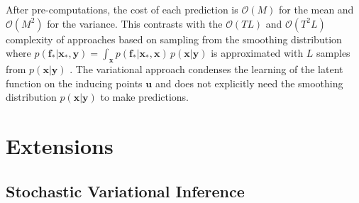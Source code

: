 \documentclass{article} %
\newcommand{\n}[1]{\mathbf{#1}}
\newcommand{\x}{\mathbf{x}}
\newcommand{\y}{\mathbf{y}}
\newcommand{\bSigma}{\boldsymbol\Sigma}
\begin{document}
After pre-computations, the cost of each prediction is $\mathcal{O}(M)$ for the mean and  $\mathcal{O}(M^2)$ for the variance. This contrasts with the $\mathcal{O}(T L)$ and $\mathcal{O}( T^2 L)$ complexity of approaches based on sampling from the smoothing distribution where
$
	p(\n{f}_* | \x_*, \y) = \int_{\x} p(\n{f}_* | \x_*, \x) \, p(\x | \y)
$
is approximated with $L$ samples from $p(\x | \y)$ \citep{FriLinSchRas13}. The variational approach condenses the learning of the latent function on the inducing points $\n{u}$ and does not explicitly need the smoothing distribution $p(\x | \y)$ to make predictions.








\vspace{-1mm}
\section{Extensions}
\vspace{-1mm}
\subsection{Stochastic Variational Inference}
\end{document}
